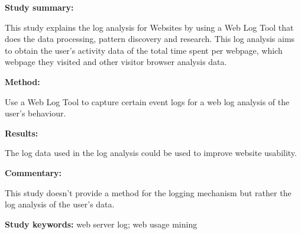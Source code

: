 \begin{tcolorbox}[colback=gray!5!white, colframe=pastelgreen!40!black, title=Analysis of visitor's behavior from Web Log using Web Log Expert Tool\cite{Kumar2017}]
	\begin{minipage}[t]{0.25\textwidth}
		\textbf{Study summary:}
	\end{minipage}
	\hfill
	\begin{minipage}[t]{0.65\textwidth}
		This study explains the log analysis for Websites by using a Web Log Tool that does the
		data processing, pattern discovery and research. This log analysis aims to obtain the user's
		activity data of the total time spent per webpage, which webpage they visited and other
		visitor browser analysis data.
	\end{minipage}

	\vspace{0.75em} 

	\begin{minipage}[t]{0.25\textwidth}
		\textbf{Method:}
	\end{minipage}
	\hfill
	\begin{minipage}[t]{0.65\textwidth}
		Use a Web Log Tool to capture certain event logs for a web log analysis of the user's behaviour.
	\end{minipage}

	\vspace{0.75em} 

	\begin{minipage}[t]{0.25\textwidth}
		\textbf{Results:}
	\end{minipage}
	\hfill
	\begin{minipage}[t]{0.65\textwidth}
		The log data used in the log analysis could be used to improve website usability.
	\end{minipage}

	\vspace{0.75em} 

	\begin{minipage}[t]{0.25\textwidth}
		\textbf{Commentary:}
	\end{minipage}
	\hfill
	\begin{minipage}[t]{0.65\textwidth}
		This study doesn't provide a method for the logging mechanism but rather the log analysis of
		the user's data.  
	\end{minipage}
	\tcblower
	\textbf{Study keywords:} web server log; web usage mining
\end{tcolorbox}